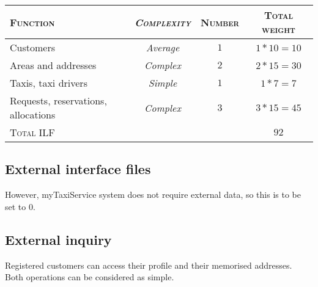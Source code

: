 \begin{table*}\begin{tabularx}{\textwidth}{ X >{\itshape}C{\myWFP} C{\myWFP} C{\myWFP} }

\toprule
	
	\normalfont\textsc{Function} &
	\normalfont\textsc{Complexity}	& 
	\normalfont\textsc{Number} &
	\normalfont\textsc{Total weight} \\

\toprule

	Customers	& Average	& $ 1 $		& $ 1*10 = 10 $ \\
\midrule
	Areas and addresses		& Complex	& $ 2 $		& $ 2*15 = 30 $ \\
\midrule
	Taxis, taxi drivers		& Simple		& $ 1 $		& $ 1*7 = 7 $ \\
\midrule
	Requests, reservations, allocations	& Complex	& $ 3 $ 	& $ 3*15 = 45 $ \\

\bottomrule

\normalfont\textsc{Total} ILF && & $ 92 $ \\

\bottomrule


\end{tabularx}\end{table*}





\subsection*{External interface files} 


However, myTaxiService system does not require external data, so this is to be set to $ 0 $.







\subsection*{External inquiry}
 

Registered customers can access their profile and their memorised addresses. Both operations can be considered as simple.


